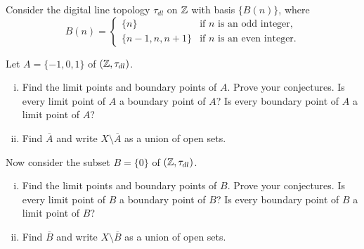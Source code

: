 \item Consider the digital line topology $\tau_{dl}$ on $\mathbb{Z}$ with basis $\{B(n)\}$, where 
\[B(n) = \begin{cases} \{n\}	&\text{if $n$ is an odd integer}, \\ \{n-1,n,n+1\}	&\text{if $n$ is an even integer}. \end{cases}\]
\ba
\item Let $A = \{-1,0,1\}$ of $(\mathbb{Z}, \tau_{dl})$.
	\begin{enumerate}[i.]
	\item Find the limit points and boundary points of $A$. Prove your conjectures. Is every limit point of $A$ a boundary point of $A$? Is every boundary point of $A$ a limit point of $A$? 


	\item Find $\overline{A}$ and write $X \setminus \overline{A}$ as a union of open sets. 

	\end{enumerate}
	
\item Now consider the subset $B = \{0\}$ of $(\mathbb{Z}, \tau_{dl})$. 
	\begin{enumerate}[i.]
	\item Find the limit points and boundary points of $B$. Prove your conjectures. Is every limit point of $B$ a boundary point of $B$? Is every boundary point of $B$ a limit point of $B$?

	\item Find $\overline{B}$ and write $X \setminus \overline{B}$ as a union of open sets. 

	\end{enumerate}
	
\ea

